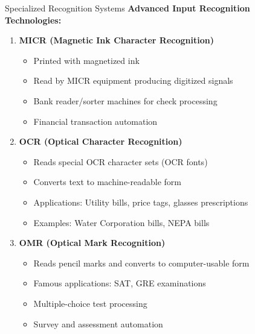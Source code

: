 \documentclass[aspectratio=169]{beamer}
\begin{document}
\begin{frame}{Specialized Recognition Systems}
    \textbf{Advanced Input Recognition Technologies:}
    
    \begin{enumerate}
        \item \textbf{MICR (Magnetic Ink Character Recognition)}
        \begin{itemize}
            \item Printed with magnetized ink
            \item Read by MICR equipment producing digitized signals
            \item Bank reader/sorter machines for check processing
            \item Financial transaction automation
        \end{itemize}
        
        \item \textbf{OCR (Optical Character Recognition)}
        \begin{itemize}
            \item Reads special OCR character sets (OCR fonts)
            \item Converts text to machine-readable form
            \item Applications: Utility bills, price tags, glasses prescriptions
            \item Examples: Water Corporation bills, NEPA bills
        \end{itemize}
        
        \item \textbf{OMR (Optical Mark Recognition)}
        \begin{itemize}
            \item Reads pencil marks and converts to computer-usable form
            \item Famous applications: SAT, GRE examinations
            \item Multiple-choice test processing
            \item Survey and assessment automation
        \end{itemize}
    \end{enumerate}
\end{frame}
\end{document}
